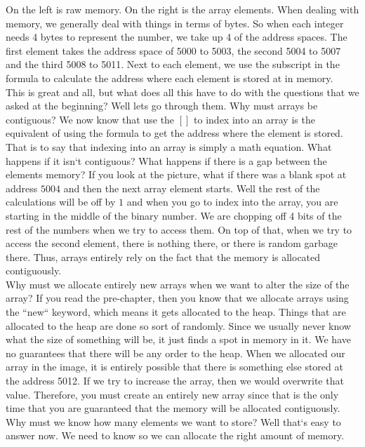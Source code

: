 \documentclass[11]{article}
\begin{document}
On the left is raw memory. On the right is the array elements. When dealing with memory, we generally deal with things in terms of bytes. So when each integer needs 4 bytes to represent the number, we take up 4 of the address spaces. The first element takes the address space of 5000 to 5003, the second 5004 to 5007 and the third 5008 to 5011. Next to each element, we use the subscript in the formula to calculate the address where each element is stored at in memory.\\

This is great and all, but what does all this have to do with the questions that we asked at the beginning? Well lets go through them. Why must arrays be contiguous? We now know that use the $[ ]$ to index into an array is the equivalent of using the formula to get the address where the element is stored. That is to say that indexing into an array is simply a math equation. What happens if it isn`t contiguous? What happens if there is a gap between the elements memory? If you look at the picture, what if there was a blank spot at address $5004$ and then the next array element starts. Well the rest of the calculations will be off by $1$ and when you go to index into the array, you are starting in the middle of the binary number. We are chopping off 4 bits of the rest of the numbers when we try to access them. On top of that, when we try to access the second element, there is nothing there, or there is random garbage there. Thus, arrays entirely rely on the fact that the memory is allocated contiguously.\\

Why must we allocate entirely new arrays when we want to alter the size of the array? If you read the pre-chapter, then you know that we allocate arrays using the ``new`` keyword, which means it gets allocated to the heap. Things that are allocated to the heap are done so sort of randomly. Since we usually never know what the size of something will be, it just finds a spot in memory in it. We have no guarantees that there will be any order to the heap. When we allocated our array in the image, it is entirely possible that there is something else stored at the address 5012. If we try to increase the array, then we would overwrite that value. Therefore, you must create an entirely new array since that is the only time that you are guaranteed that the memory will be allocated contiguously.\\

Why must we know how many elements we want to store? Well that`s easy to answer now. We need to know so we can allocate the right amount of memory.\\
\end{document}
